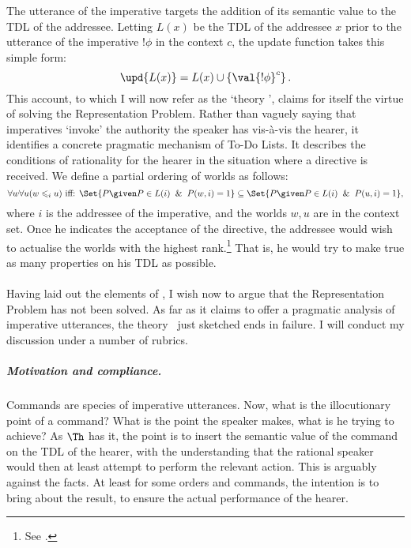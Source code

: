 The utterance of the imperative targets the addition of its semantic value to the TDL of the addressee. Letting $L(x)$ be the TDL of the addressee $x$ prior to the utterance of the imperative $!\phi$ in the context $c$, the update function takes this simple form:
\begin{equation}
  \label{eq:3}
  \upd{L(x)} = L(x) \cup \left\{\val{!\phi}^c\right\}.
\end{equation}
This account, to which I will now refer as the `theory \Th', claims for itself the virtue of solving the Representation Problem. Rather than vaguely saying that imperatives `invoke' the authority the speaker has vis-\`a-vis the hearer, it identifies a concrete pragmatic mechanism of To-Do Lists. It describes the conditions of rationality for the hearer in the situation where a directive is received. We define a partial ordering of worlds as follows:
\begin{equation}\label{eq:4}
   \forall w \forall u (w \leqslant_i u) \text{ iff: } \Set{P \given P \in L(i) \And P(w,i)=1} \subseteq \Set{P \given P \in L(i) \And P(u,i)=1},
\end{equation}
where $i$ is the addressee of the imperative, and the worlds $w,u$ are in the context set. Once he indicates the acceptance of the directive, the addressee would wish to actualise the worlds with the highest rank.\footnote{See \citet[243--3]{Por04}.} That is, he would try to make true as many properties on his TDL as possible. 

\paragraph{}
Having laid out the elements of \Th, I wish now to argue that the Representation Problem has not been solved. As far as it claims to offer a pragmatic analysis of imperative utterances, the theory \Th\ just sketched ends in failure. I will conduct my discussion under a number of rubrics.

\subparagraph{Motivation and compliance.}
Commands are species of imperative utterances. Now, what is the illocutionary point of a command? What is the point the speaker makes, what is he trying to achieve? As $\Th$ has it, the point is to insert the semantic value of the command on the TDL of the hearer, with the understanding that the rational speaker would then at least attempt to perform the relevant action. This is arguably against the facts. At least for some orders and commands, the intention is to bring about the result, to ensure the actual performance of the hearer.


